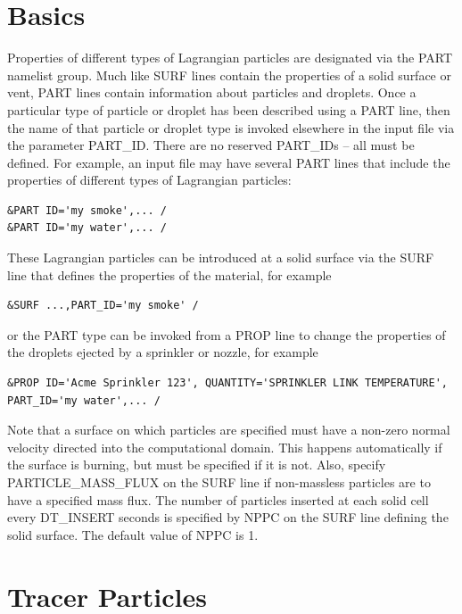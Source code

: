 \documentclass[11pt]{book}
\begin{document}
\section{Basics}

Properties of different types of
Lagrangian particles are designated via the {\ct PART} namelist group.
Much like {\ct SURF} lines contain the properties of a solid surface or
vent, {\ct PART} lines contain information about particles and droplets.
Once a particular type of particle or droplet has been described using
a {\ct PART} line, then the name of that particle or droplet type is invoked
elsewhere in the input file via the parameter {\ct PART\_ID}. There are no reserved {\ct PART\_ID}s -- all must be defined.
For example, an input file may have several {\ct PART} lines that include the
properties of different types of Lagrangian particles:

\footnotesize
\begin{verbatim}
&PART ID='my smoke',... /
&PART ID='my water',... /
\end{verbatim}
\normalsize
These Lagrangian particles can be introduced at a solid surface via the {\ct SURF} line
that defines the properties of the material, for example

\footnotesize
\begin{verbatim}
&SURF ...,PART_ID='my smoke' /
\end{verbatim}
\normalsize
or the {\ct PART} type can be invoked from a {\ct PROP} line to change
the properties of the droplets ejected by a sprinkler or nozzle, for example

\footnotesize
\begin{verbatim}
&PROP ID='Acme Sprinkler 123', QUANTITY='SPRINKLER LINK TEMPERATURE', PART_ID='my water',... /
\end{verbatim}
\normalsize
Note that a surface on which particles are specified must have a non-zero normal velocity directed into the
computational domain. This happens automatically if the surface is burning, but must be specified
if it is not. Also, specify {\ct PARTICLE\_MASS\_FLUX} on the {\ct SURF} line if non-massless particles
are to have a specified mass flux. The number of particles inserted at each solid cell every
{\ct DT\_INSERT} seconds is specified by {\ct NPPC} on the {\ct SURF} line defining the solid surface. The default
value of {\ct NPPC} is 1.


\section{Tracer Particles}
\end{document}
